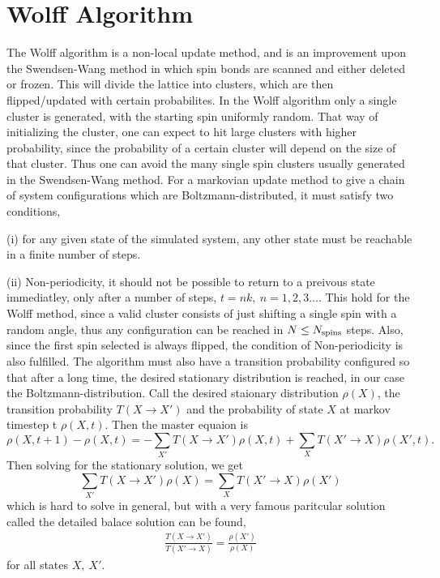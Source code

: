 \section{Wolff Algorithm}
The Wolff algorithm is a non-local update method, and is an improvement upon the Swendsen-Wang method in which spin bonds are scanned and either deleted or frozen. This will divide the lattice into clusters, which are then flipped/updated with certain probabilites. In the Wolff algorithm only a single cluster is generated, with the starting spin uniformly random. That way of initializing the cluster, one can expect to hit large clusters with higher probability, since the probability of a certain cluster will depend on the size of that cluster.
Thus one can avoid the many single spin clusters usually generated in the Swendsen-Wang method.
For a markovian update method to give a chain of system configurations which are Boltzmann-distributed, it must satisfy two conditions, 

(i) for any given state of the simulated system, any other state must be reachable in a finite number of steps.

(ii) Non-periodicity, it should not be possible to return to a preivous state immediatley, only after a number of steps, $t =nk,~ n = 1,2,3\dots$.
This hold for the Wolff method, since a valid cluster consists of just shifting a single spin with a random angle, thus any configuration can be reached in $N \leq N_{\textrm{spins}}$ steps.
Also, since the first spin selected is always flipped, the condition of Non-periodicity is also fulfilled.
The algorithm must also have a transition probability configured so that after a long time, the desired stationary distribution is reached, in our case the Boltzmann-distribution.
Call the desired staionary distribution $\rho(X)$, the transition probability $T(X \rightarrow X')$ and the probability of state $X$ at markov timestep t $\rho(X,t)$.
Then the master equaion is 
\begin{equation}
  \rho(X, t+1) - \rho(X,t) = -\sum_{X'} T(X\rightarrow X')\rho(X,t) +\sum_{X} T(X'\rightarrow X)\rho(X',t).
\end{equation}
Then solving for the stationary solution, we get
\begin{equation}
  \sum_{X'}T(X\rightarrow X') \rho(X) =  \sum_{X}T(X'\rightarrow X) \rho(X')
\end{equation}
which is hard to solve in general, but with a very famous paritcular solution called the detailed balace solution can be found,
\begin{align}
  \frac{T(X\rightarrow X')}{T(X'\rightarrow X)} = \frac{\rho(X')}{\rho(X)} 
  \label{eq:detbal}
\end{align}
for all states $X,~X'$.

